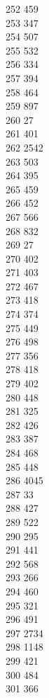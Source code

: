 { 252	459 \\
 253	347 \\
 254	507 \\
 255	532 \\
 256	334 \\
 257	394 \\
 258	464 \\
 259	897 \\
 260	27 \\
 261	401 \\
 262	2542 \\
 263	503 \\
 264	395 \\
 265	459 \\
 266	452 \\
 267	566 \\
 268	832 \\
 269	27 \\
 270	402 \\
 271	403 \\
 272	467 \\
 273	418 \\
 274	374 \\
 275	449 \\
 276	498 \\
 277	356 \\
 278	418 \\
 279	402 \\
 280	448 \\
 281	325 \\
 282	426 \\
 283	387 \\
 284	468 \\
 285	448 \\
 286	4045 \\
 287	33 \\
 288	427 \\
 289	522 \\
 290	295 \\
 291	441 \\
 292	568 \\
 293	266 \\
 294	460 \\
 295	321 \\
 296	491 \\
 297	2734 \\
 298	1148 \\
 299	421 \\
 300	484 \\
 301	366 \\
}
